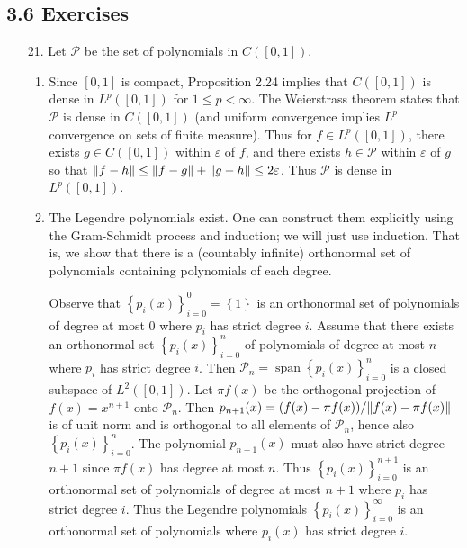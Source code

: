 \documentclass[11pt,leqno]{article}
\theoremstyle{plain}
\theoremstyle{definition}
\numberwithin{equation}{section}
\numberwithin{lem}{section}
\newcommand{\cbr}[1]{\left\{#1\right\}}
\DeclareMathOperator{\Span}{span}
\begin{document}
\subsection*{3.6 Exercises}
\begin{enumerate}
    \item[21.] Let $\mathcal P$ be the set of polynomials in $C([0,1])$.
    \begin{enumerate}
        \item Since $[0,1]$ is compact, Proposition 2.24 implies that $C([0,1])$ is dense in $L^p([0,1])$ for $1\leq p <\infty$. The Weierstrass theorem states that $\mathcal P$ is dense in $C([0,1])$ (and uniform convergence implies $L^p$ convergence on sets of finite measure). Thus for $f\in L^p([0,1])$, there exists $g\in C([0,1])$ within $\varepsilon$ of $f$, and there exists $h\in \mathcal P$ within $\varepsilon$ of $g$ so that $\norm{f-h}\leq \norm{f-g} + \norm{g-h}\leq 2\varepsilon$. Thus $\mathcal P$ is dense in $L^p([0,1])$.
        \item The Legendre polynomials exist. One can construct them explicitly using the Gram-Schmidt process and induction; we will just use induction. That is, we show that there is a (countably infinite) orthonormal set of polynomials containing polynomials of each degree.
        
        Observe that $\cbr{p_i(x)}_{i=0}^0 = \cbr{1}$ is an orthonormal set of polynomials of degree at most $0$ where $p_i$ has strict degree $i$. Assume that there exists an orthonormal set $\cbr{p_i(x)}_{i=0}^n$ of polynomials of degree at most $n$ where $p_i$ has strict degree $i$. Then $\mathcal P_n = \Span \cbr{p_i(x)}_{i=0}^n$ is a closed subspace of $L^2([0,1])$. Let $\pi f(x)$ be the orthogonal projection of $f(x) = x^{n+1}$ onto $\mathcal P_n$. Then $p_{n+1}(x) = (f(x)-\pi f(x))/\norm{f(x)-\pi f(x)}$ is of unit norm and is orthogonal to all elements of $\mathcal P_n$, hence also $\cbr{p_i(x)}_{i=0}^n$. The polynomial $p_{n+1}(x)$ must also have strict degree $n+1$ since $\pi f(x)$ has degree at most $n$. Thus $\cbr{p_i(x)}_{i=0}^{n+1}$ is an orthonormal set of polynomials of degree at most $n+1$ where $p_i$ has strict degree $i$. Thus the Legendre polynomials $\cbr{p_i(x)}_{i=0}^\infty$ is an orthonormal set of polynomials where $p_i(x)$ has strict degree $i$.


\end{enumerate}
\end{enumerate}
\end{document}
